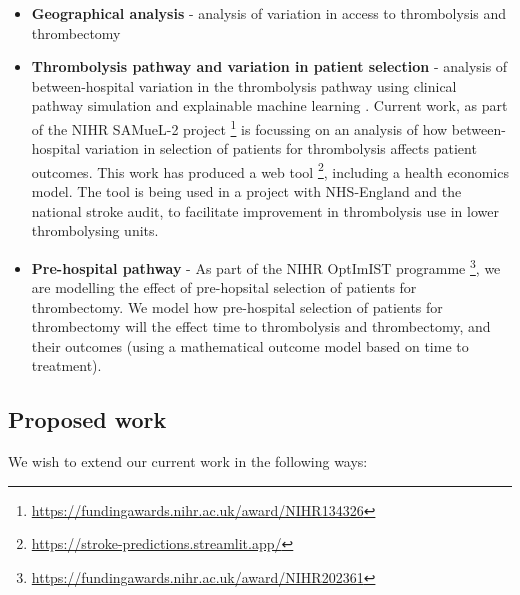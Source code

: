 \begin{itemize}
    \item \textbf{Geographical analysis} - analysis of variation in access to thrombolysis and thrombectomy \cite{allen_maximising_2019}

    \item \textbf{Thrombolysis pathway and variation in patient selection} - analysis of between-hospital variation in the thrombolysis pathway using clinical pathway simulation and explainable machine learning \cite{allen_use_2022, pearn_what_2023}. Current work, as part of the NIHR SAMueL-2 project \footnote{\url{https://fundingawards.nihr.ac.uk/award/NIHR134326}} is focussing on an analysis of how between-hospital variation in selection of patients for thrombolysis affects patient outcomes. This work has produced a web tool \footnote{\url{https://stroke-predictions.streamlit.app/}}, including a health economics model. The tool is being used in a project with NHS-England and the national stroke audit, to facilitate improvement in thrombolysis use in lower thrombolysing units. 

    \item \textbf{Pre-hospital pathway} - As part of the NIHR OptImIST programme \footnote{\url{https://fundingawards.nihr.ac.uk/award/NIHR202361}}, we are modelling the effect of pre-hopsital selection of patients for thrombectomy. We model how pre-hospital selection of patients for thrombectomy will the effect time to thrombolysis and thrombectomy, and their outcomes (using a mathematical outcome model based on time to treatment).
    
\end{itemize}

\subsection*{Proposed work}

We wish to extend our current work in the following ways:

